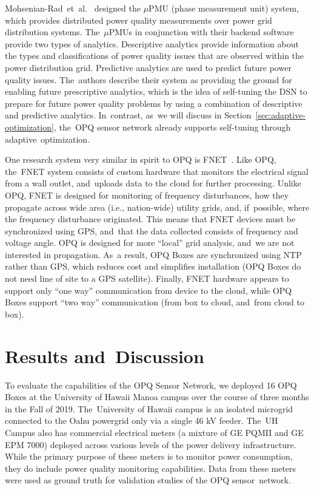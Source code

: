\documentclass[energies,article,accept,moreauthors,pdftex]{Definitions/mdpi}
\begin{document}
Mohsenian-Rad~et~al.~\cite{mohsenian-rad_distribution_2018} designed the $\mu$PMU (phase measurement unit) system, which provides distributed power quality measurements over power grid distribution systems. The~$\mu$PMUs in conjunction with their backend software provide two types of analytics. Descriptive analytics provide information about the types and classifications of power quality issues that are observed within the power distribution grid. Predictive analytics are used to predict future power quality issues. The~authors describe their system as providing the ground for enabling future prescriptive analytics, which is the idea of self-tuning the DSN to prepare for future power quality problems by using a combination of descriptive and predictive analytics. In~contrast, as~we will discuss in Section~\ref{sec:adaptive-optimization}, the~OPQ sensor network already supports self-tuning through adaptive~optimization.

One research system very similar in spirit to OPQ is FNET~\cite{liu_distribution_2017}. Like OPQ, the~FNET system consists of custom hardware that monitors the electrical signal from a wall outlet, and~uploads data to the cloud for further processing. Unlike OPQ, FNET is designed for monitoring of frequency disturbances, how they propagate across wide area (i.e., nation-wide) utility grids, and, if~possible, where the frequency disturbance originated. This means that FNET devices must be synchronized using GPS, and~that the data collected consists of frequency and voltage angle. OPQ is designed for more “local” grid analysis, and~we are not interested in propagation. As~a result, OPQ Boxes are synchronized using NTP rather than GPS, which reduces cost and simplifies installation (OPQ Boxes do not need line of site to a GPS satellite). Finally, FNET hardware appears to support only “one way” communication from device to the cloud, while OPQ Boxes support ``two way'' communication (from box to cloud, and~from cloud to box).

\section{Results and~Discussion}
\label{sec:pilot-study}

To evaluate the capabilities of the OPQ Sensor Network, we deployed 16 OPQ Boxes at the University of Hawaii Manoa campus over the course of three months in the Fall of 2019. The~University of Hawaii campus is an isolated microgrid connected to the Oahu powergrid only via a single 46 kV feeder. The~UH Campus also has commercial electrical meters (a mixture of GE PQMII and GE EPM 7000) deployed across various levels of the power delivery infrastructure. While the primary purpose of these meters is to monitor power consumption, they do include power quality monitoring capabilities. Data from these meters were used as ground truth for validation studies of the OPQ sensor~network.
\end{document}

